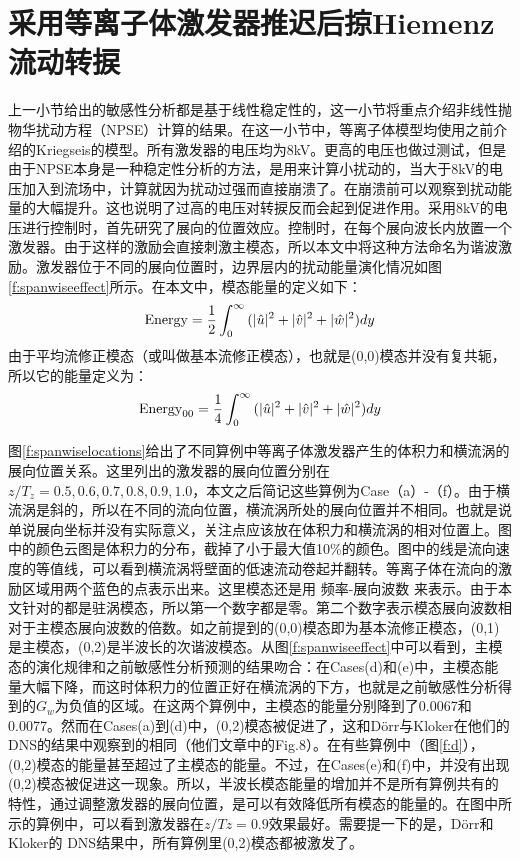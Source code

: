 \section{采用等离子体激发器推迟后掠Hiemenz流动转捩}
上一小节给出的敏感性分析都是基于线性稳定性的，这一小节将重点介绍非线性抛物华扰动方程（NPSE）计算的结果。在这一小节中，等离子体模型均使用之前介绍的Kriegseis的模型\cite{kriegseis2013velocity}。所有激发器的电压均为8kV。更高的电压也做过测试，但是由于NPSE本身是一种稳定性分析的方法，是用来计算小扰动的，当大于8kV的电压加入到流场中，计算就因为扰动过强而直接崩溃了。在崩溃前可以观察到扰动能量的大幅提升。这也说明了过高的电压对转捩反而会起到促进作用。采用8kV的电压进行控制时，首先研究了展向的位置效应。控制时，在每个展向波长内放置一个激发器。由于这样的激励会直接刺激主模态，所以本文中将这种方法命名为谐波激励。激发器位于不同的展向位置时，边界层内的扰动能量演化情况如图\ref{f:spanwiseeffect}所示。在本文中，模态能量的定义如下：
\begin{equation}
{\rm Energy}=\frac{1}{2}\int_{0}^{\infty}{(|\hat u|^2+|\hat v|^2+|\hat w|^2)dy}
\end{equation}
由于平均流修正模态（或叫做基本流修正模态），也就是(0,0)模态并没有复共轭，所以它的能量定义为：
\begin{equation}
{\rm Energy}_{00}=\frac{1}{4}\int_{0}^{\infty}{(|\hat u|^2+|\hat v|^2+|\hat w|^2)dy}
\end{equation}

图\ref{f:spanwiselocations}给出了不同算例中等离子体激发器产生的体积力和横流涡的展向位置关系。这里列出的激发器的展向位置分别在$z/T_z = 0.5, 0.6, 0.7, 0.8, 0.9, 1.0$，本文之后简记这些算例为Case（a）-（f）。由于横流涡是斜的，所以在不同的流向位置，横流涡所处的展向位置并不相同。也就是说单说展向坐标并没有实际意义，关注点应该放在体积力和横流涡的相对位置上。图中的颜色云图是体积力的分布，截掉了小于最大值10\%的颜色。图中的线是流向速度的等值线，可以看到横流涡将壁面的低速流动卷起并翻转。等离子体在流向的激励区域用两个蓝色的点表示出来。这里模态还是用 频率-展向波数 来表示。由于本文针对的都是驻涡模态，所以第一个数字都是零。第二个数字表示模态展向波数相对于主模态展向波数的倍数。如之前提到的(0,0)模态即为基本流修正模态，(0,1)是主模态，(0,2)是半波长的次谐波模态。从图\ref{f:spanwiseeffect}中可以看到，主模态的演化规律和之前敏感性分析预测的结果吻合：在Cases(d)和(e)中，主模态能量大幅下降，而这时体积力的位置正好在横流涡的下方，也就是之前敏感性分析得到的$G_w$为负值的区域。在这两个算例中，主模态的能量分别降到了0.0067和0.0077。然而在Cases(a)到(d)中，(0,2)模态被促进了，这和D\"orr与Kloker\cite{dorr2016}在他们的DNS的结果中观察到的相同（他们文章中的Fig.8）。在有些算例中（图\ref{f:d}），(0,2)模态的能量甚至超过了主模态的能量。不过，在Cases(e)和(f)中，并没有出现(0,2)模态被促进这一现象。所以，半波长模态能量的增加并不是所有算例共有的特性，通过调整激发器的展向位置，是可以有效降低所有模态的能量的。在图中所示的算例中，可以看到激发器在$z/Tz=0.9$效果最好。需要提一下的是，D\"orr和Kloker的 DNS\cite{dorr2016}结果中，所有算例里(0,2)模态都被激发了。


